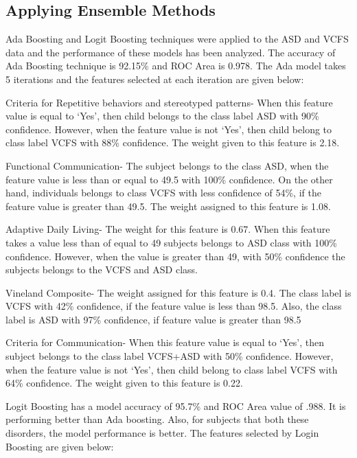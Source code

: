 \subsection{Applying Ensemble Methods}
Ada Boosting and Logit Boosting techniques were applied to the ASD and VCFS data and the performance of these models has been analyzed. The accuracy of Ada Boosting technique is 92.15\% and ROC Area is 0.978. The Ada model takes 5 iterations and the features selected at each iteration are given below:
\begin{compactenum}
\item Criteria for Repetitive behaviors and stereotyped patterns- When this feature value is equal to ‘Yes’, then child belongs to the class label ASD with 90\% confidence. However, when the feature value is not ‘Yes’, then child belong to class label VCFS  with 88\% confidence. The weight given to this feature is 2.18.
\item Functional Communication- The subject belongs to the class ASD, when the feature value is less than or equal to 49.5 with 100\% confidence. On the other hand, individuals belongs to class VCFS with less confidence of 54\%, if the feature value is greater than 49.5. The weight assigned to this feature is 1.08.
\item Adaptive Daily Living- The weight for this feature is 0.67. When this feature takes a value less than of equal to 49 subjects belongs to ASD class with 100\% confidence. However, when the value is greater than 49, with 50\% confidence the subjects belongs to the VCFS and ASD class.
\item Vineland Composite- The weight assigned for this feature is 0.4. The class label is VCFS with 42\% confidence, if the feature value is less than 98.5. Also, the class label is ASD with 97\% confidence, if feature value is greater than 98.5
\item Criteria for Communication- When this feature value is equal to ‘Yes’, then subject belongs to the class label VCFS+ASD with 50\% confidence. However, when the feature value is not ‘Yes’, then child belong to class label VCFS  with 64\% confidence. The weight given to this feature is 0.22.
\end{compactenum}
Logit Boosting has a model accuracy of 95.7\% and ROC Area value of .988. It is performing better than Ada boosting. Also, for subjects that both these disorders, the model performance is better. The features selected by Login Boosting are given below:
